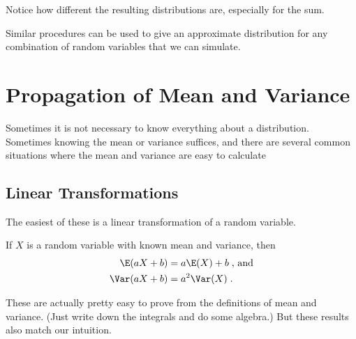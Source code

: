 \documentclass[twoside]{book}\usepackage[]{graphicx}\usepackage[]{xcolor}
\newlength{\tempfmlength}
\newenvironment{fmpage}[1]
     {
	 \medskip
	 \setlength{\tempfmlength}{#1}
	 \begin{lrbox}{\fmbox}
	   \begin{minipage}{#1}
		 \vspace*{.02\tempfmlength}
		 \hfill
	   \begin{minipage}{.95 \tempfmlength}}
		 {\end{minipage}\hfill
		 \vspace*{.015\tempfmlength}
		 \end{minipage}\end{lrbox}\fbox{\usebox{\fmbox}}
	 \medskip
	 }
\newenvironment{boxedText}[1][.98\textwidth]%
{%
\begin{center}
\begin{fmpage}{#1}
}%
{%
\end{fmpage}
\end{center}
}
\begin{document}
Notice how different the resulting distributions are, especially for the sum.

Similar procedures can be used to give an approximate distribution for any combination
of random variables that we can simulate.

\section{Propagation of Mean and Variance}

Sometimes it is not necessary to know everything about a distribution.  Sometimes knowing 
the mean or variance suffices, and there are several common situations where the mean
and variance are easy to calculate

\subsection{Linear Transformations}
The easiest of these is a linear transformation of a random variable.  

\begin{boxedText}
If $X$ is a random variable with known mean and variance, then 
\begin{align*}
	\E(a X + b) &= a \E(X) + b \; \mbox{, and}
	\\
		\Var(a X + b) &= a^2 \Var (X) \; .
\end{align*}
\end{boxedText}

These are actually pretty easy to prove from the definitions of mean and variance.  (Just 
write down the integrals and do some algebra.)  But these results also match our 
intuition.
\end{document}
